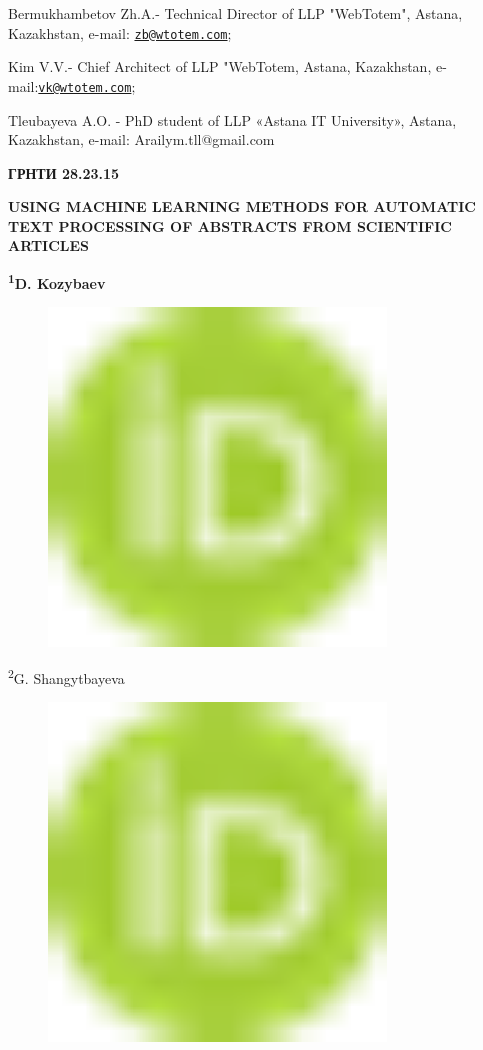 {Bermukhambetov Zh.A.- Technical Director of LLP "WebTotem", Astana,
Kazakhstan, e-mail:
\href{mailto:zb@wtotem.com}{\nolinkurl{zb@wtotem.com}};

Kim V.V.- Chief Architect of LLP "WebTotem, Astana, Kazakhstan,
e-mail:\href{mailto:vk@wtotem.com}{\nolinkurl{vk@wtotem.com}};

Tleubayeva A.O. - PhD student of LLP «Astana IT University», Astana,
Kazakhstan, e-mail: Arailym.tll@gmail.com

{\bfseries ГРНТИ 28.23.15}

{\bfseries USING MACHINE LEARNING METHODS FOR AUTOMATIC TEXT PROCESSING OF
ABSTRACTS FROM SCIENTIFIC ARTICLES}

{\bfseries \textsuperscript{1}D. Kozybaev}
\begin{figure}[H]
	\centering
	\includegraphics[width=0.8\textwidth]{media/ict/image1}
	\caption*{}
\end{figure}

\textsuperscript{2}G. Shangytbayeva}
\begin{figure}[H]
	\centering
	\includegraphics[width=0.8\textwidth]{media/ict/image1}
	\caption*{}
\end{figure}

